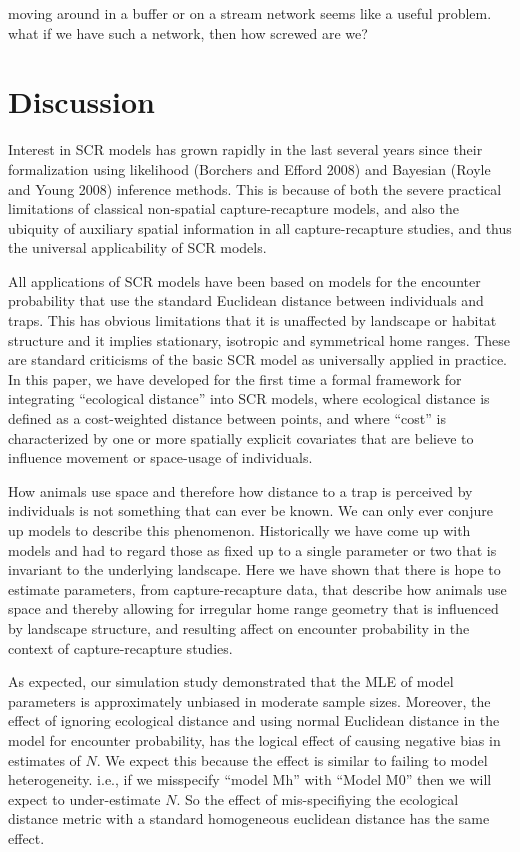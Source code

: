 moving around in a buffer or on a stream network seems like a useful
problem. what if we have such a network, then how screwed are we?








\section{Discussion}

Interest in SCR models has grown rapidly in the last several years
since their formalization using likelihood (Borchers and Efford 2008)
and Bayesian (Royle and Young 2008) inference methods. This is because
of both the severe practical limitations of classical non-spatial
capture-recapture models, and also the ubiquity of auxiliary spatial
information in all capture-recapture studies, and thus the universal
applicability of SCR models.

All applications of SCR models have been based on models for the
encounter probability that use the standard Euclidean distance between
individuals and traps. This has obvious limitations that it is
unaffected by landscape or habitat structure and it implies
stationary,  isotropic and symmetrical home ranges. These are standard
criticisms of the basic SCR model as universally applied in practice. 
In this paper,  we have developed for the first time a formal framework for integrating
``ecological distance'' into SCR models, where ecological distance is
defined as a cost-weighted distance between points, and where ``cost''
is characterized by one or more spatially explicit covariates that are
believe to influence movement or space-usage of individuals.  


How animals use space and therefore how distance to a trap is
perceived by individuals is not something that can ever be known. We
can only ever conjure up models to describe this
phenomenon. Historically we have come up with models and had to regard
those as fixed up to a single parameter or two that is invariant to
the underlying landscape. Here we have shown that there is hope to
estimate parameters, from capture-recapture data,
 that describe how animals use space and thereby
allowing for irregular home range geometry that is influenced by
landscape structure, and resulting affect on encounter probability in
the context of capture-recapture studies. 

As expected, our simulation study demonstrated that the MLE of model
parameters is approximately unbiased in moderate sample
sizes. Moreover, the 
effect of ignoring ecological distance and using normal Euclidean
distance in the model for encounter probability, has the 
logical effect of causing negative bias
in estimates of $N$. We expect this because the effect is similar to
failing to model heterogeneity. i.e., if we misspecify ``model Mh'' with
``Model M0'' then we will expect to under-estimate $N$. So the effect of
mis-specifiying the ecological distance metric with a standard
homogeneous euclidean distance has the same effect.

